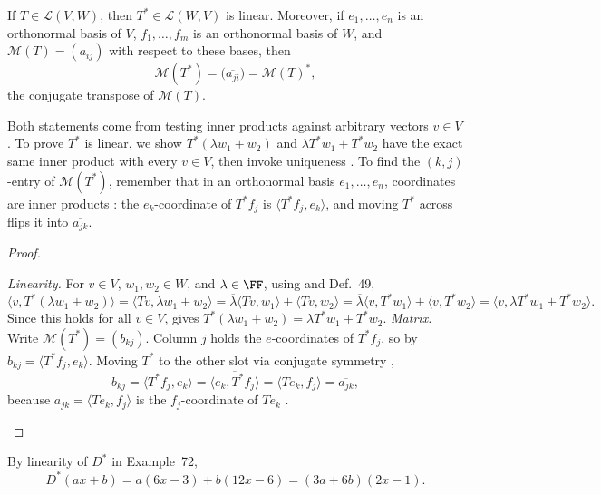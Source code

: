 \documentclass[10pt]{scrartcl}
\newcommand{\LL}{\mathcal L}\newcommand{\PP}{\mathcal P}\newcommand{\MM}{\mathcal M}
\begin{document}
\begin{proposition*}
  If $T\in\LL(V,W)$, then $T^*\in\LL(W,V)$ is linear. Moreover, if $e_1,\dots,e_n$ is an orthonormal basis of $V$, $f_1,\dots,f_m$ is an orthonormal basis of $W$, and $\MM(T)=(a_{ij})$ with respect to these bases, then
  \[
    \MM(T^*) = \bigl(\overline{a_{ji}}\bigr) = \MM(T)^*,
  \]
  the conjugate transpose of $\MM(T)$.
\end{proposition*}
\begin{ideabox}
  Both statements come from testing inner products against arbitrary vectors $v\in V$. To prove $T^*$ is linear, we show $T^*(\lambda w_1+w_2)$ and $\lambda T^*w_1+T^*w_2$ have the exact same inner product with every $v\in V$, then invoke uniqueness . To find the $(k,j)$-entry of $\MM(T^*)$, remember that in an orthonormal basis $e_1,\dots,e_n$, coordinates are inner products : the $e_k$-coordinate of $T^*f_j$ is $\langle T^*f_j,e_k\rangle$, and moving $T^*$ across flips it into $\overline{a_{jk}}$.
\end{ideabox}
\begin{proof}
  \begin{steps}
    \ii \emph{Linearity.} For $v\in V$, $w_1,w_2\in W$, and $\lambda\in\FF$, using  and Def.~49,
    \[
      \langle v, T^*(\lambda w_1+w_2)\rangle
      = \langle Tv,\lambda w_1+w_2\rangle
      = \overline{\lambda}\langle Tv,w_1\rangle + \langle Tv,w_2\rangle
      = \overline{\lambda}\langle v,T^*w_1\rangle + \langle v,T^*w_2\rangle
      = \langle v,\lambda T^*w_1+T^*w_2\rangle.
    \]
    Since this holds for all $v\in V$,  gives $T^*(\lambda w_1+w_2)=\lambda T^*w_1+T^*w_2$.
    \ii \emph{Matrix.} Write $\MM(T^*)=(b_{kj})$. Column $j$ holds the $e$-coordinates of $T^*f_j$, so by  $b_{kj}=\langle T^*f_j,e_k\rangle$. Moving $T^*$ to the other slot via conjugate symmetry ,
    \[
      b_{kj} = \langle T^*f_j,e_k\rangle = \overline{\langle e_k,T^*f_j\rangle} = \overline{\langle Te_k,f_j\rangle} = \overline{a_{jk}},
    \]
    because $a_{jk}=\langle Te_k,f_j\rangle$ is the $f_j$-coordinate of $Te_k$ .
  \end{steps}
\end{proof}

By linearity of $D^*$ in Example~72,
\[ D^*(ax+b)=a(6x-3)+b(12x-6)=(3a+6b)(2x-1). \]
\end{document}
